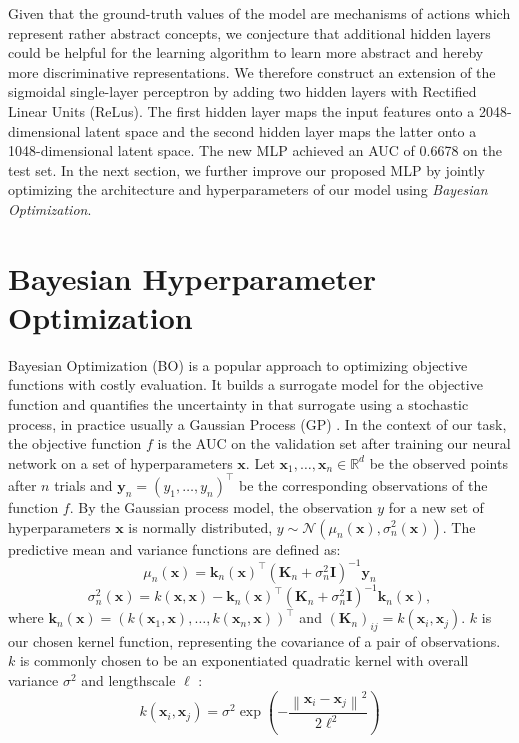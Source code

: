 \documentclass[bsc,frontabs,twoside,singlespacing,parskip,deptreport]{infthesis}     %
\begin{document}
Given that the ground-truth values of the model are mechanisms of actions which represent rather abstract concepts, we conjecture that additional hidden layers could be helpful for the learning algorithm to learn more abstract and hereby more discriminative representations. 
We therefore construct an extension of the sigmoidal single-layer perceptron by adding two hidden layers with Rectified Linear Units (ReLus). The first hidden layer maps the input features onto a 2048-dimensional latent space and the second hidden layer maps the latter onto a 1048-dimensional latent space. The new MLP achieved an AUC of 0.6678 on the test set. In the next section, we further improve our proposed MLP by jointly optimizing the architecture and hyperparameters  of our model using \textit{Bayesian Optimization}.  

\chapter{Bayesian Hyperparameter Optimization}
Bayesian Optimization (BO) is a popular approach to optimizing objective functions with costly evaluation. It builds a surrogate model for the objective function and quantifies the uncertainty in that surrogate using a stochastic process, in practice usually a Gaussian Process (GP) \cite{frazier_tutorial_2018}.
In the context of our task, the objective function \(f\) is the AUC on the validation set after training our neural network on a set of hyperparameters \(\mathbf{x}\). 
Let \(\mathbf{x}_{1}, \ldots, \mathbf{x}_{n} \in \mathbb{R}^{d}\) be the observed points after \(n\) trials and \(\mathbf{y}_{n}=\left(y_{1}, \ldots, y_{n}\right)^{\top}\) be the corresponding observations of the function \(f\).
By the Gaussian process model, the observation \(y\) for a new set of hyperparameters \(\mathbf{x}\) is normally distributed, \(y \sim \mathcal{N}\left(\mu_n(\mathbf{x}), \sigma_n^{2}(\mathbf{x})\right)\). The predictive mean and  variance functions are defined as:
\[\mu_{n}(\mathbf{x})=\mathbf{k}_{n}(\mathbf{x})^{\top}\left(\mathbf{K}_{n}+\sigma_{n}^{2} \mathbf{I}\right)^{-1} \mathbf{y}_{n}\]
\[\sigma_{n}^{2}(\mathbf{x})=k(\mathbf{x}, \mathbf{x})-\mathbf{k}_{n}(\mathbf{x})^{\top}\left(\mathbf{K}_{n}+\sigma_{n}^{2} \mathbf{I}\right)^{-1} \mathbf{k}_{n}(\mathbf{x}),\]
where
\(\mathbf{k}_{n}(\mathbf{x})=\left(k\left(\mathbf{x}_{1}, \mathbf{x}\right), \ldots, k\left(\mathbf{x}_{n}, \mathbf{x}\right)\right)^{\top}\)
and \(\left(\mathbf{K}_{n}\right)_{i j}=k\left(\mathbf{x}_{i}, \mathbf{x}_{j}\right)\). \(k\) is our chosen kernel function, representing the covariance of a pair of observations. \(k\) is commonly chosen to be an exponentiated quadratic kernel with overall variance \(\sigma^{2}\) and lengthscale \(\ell\) :
\[k\left(\mathbf{x}_{i}, \mathbf{x}_{j}\right)=\sigma^{2} \exp \left(-\frac{\left\|\mathbf{x}_{i}-\mathbf{x}_{j}\right\|^{2}}{2 \ell^{2}}\right)\]
\end{document}
